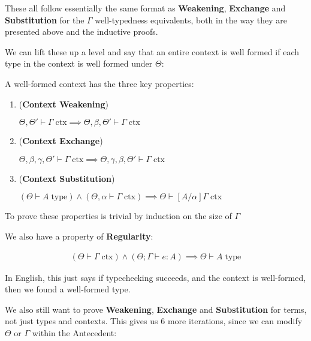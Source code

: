 \documentclass{article}
\newcommand{\centerbox}[1]{
    \begin{center}
    \fbox{
        \begin{minipage}{\dimexpr\textwidth-2.5cm}
        #1
        \end{minipage}
    }
    \end{center}
}
\newcommand{\SequentAxiomNoLabel}[1]{
    \AxiomC{}
    \UnaryInfC{#1}
    \DisplayProof
    \hspace{10px}
}
\newcommand{\SequentBinaryNoLabel}[3]{
    \AxiomC{#1}
    \AxiomC{#2}
    \BinaryInfC{#3}
    \DisplayProof
    \hspace{10px}
}
\newcommand{\SequentBox}[1]{
    \centerbox{
        \vspace{15px}
        \begin{center}
        \begin{spacing}{3.0}
            #1
            \hspace{-10px}
        \end{spacing}
        \end{center}
        \vspace{-30px}
    }
}
\newcommand{\inlineeq}[1]{
    \vspace{-2em}
    \begin{gather*}
    #1
    \end{gather*}
    \vspace{-2em}
}
\begin{document}
These all follow essentially the same format as \textbf{Weakening}, \textbf{Exchange} and \textbf{Substitution} for the $\Gamma$ well-typedness equivalents, both in the way they are presented above and the inductive proofs.

\newpage

We can lift these up a level and say that an entire context is well formed if each type in the context is well formed under $\Theta$:

\SequentBox{
    \SequentAxiomNoLabel{$\Theta \vdash \cdot \; \textrm{ctx}$}
    \SequentBinaryNoLabel{$\Theta \vdash \Gamma \; \textrm{ctx}$}{$\Theta \vdash \tau \; \textrm{type}$}{$\Theta \vdash \Gamma, \tau \; \textrm{ctx}$}
}

A well-formed context has the three key properties:

\begin{enumerate}
\item (\textbf{Context Weakening})

$\Theta, \Theta' \vdash \Gamma \; \textrm{ctx} \implies \Theta, \beta, \Theta' \vdash \Gamma \; \textrm{ctx}$

\item (\textbf{Context Exchange})

$\Theta, \beta, \gamma, \Theta' \vdash \Gamma \; \textrm{ctx} \implies \Theta, \gamma, \beta, \Theta' \vdash \Gamma \; \textrm{ctx}$

\item (\textbf{Context Substitution})

$(\Theta  \vdash A \; \textrm{type}) \land (\Theta, \alpha  \vdash \Gamma \; \textrm{ctx}) \implies 
\Theta  \vdash [A/\alpha ]\Gamma \; \textrm{ctx}$
\end{enumerate}

To prove these properties is trivial by induction on the size of $\Gamma$

We also have a property of \textbf{Regularity}:

\inlineeq{
(\Theta  \vdash \Gamma \; \textrm{ctx}) \land (\Theta ; \Gamma \vdash e : A) \implies \Theta  \vdash A \; \textrm{type}
}

In English, this just says if typechecking succeeds, and the context is well-formed, then we found a well-formed type.

We also still want to prove \textbf{Weakening}, \textbf{Exchange} and \textbf{Substitution} for terms, not just types and contexts. This gives us 6 more iterations, since we can modify $\Theta$ or $\Gamma$ within the Antecedent:
\end{document}
